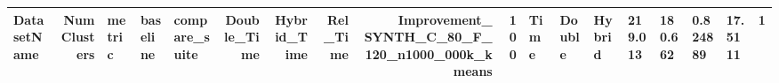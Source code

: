 \begin{tabular}{lrlllrrrrr}
\toprule
DatasetName & NumClusters & metric & baseline & compare_suite & Double_Time & Hybrid_Time & Rel_Time & Improvement_%
\midrule
SYNTH_C_80_F_120_n1000_000k_kmeans & 100 & Time & Double & Hybrid & 219.013 & 180.662 & 0.824889 & 17.5111 & 1 \\
\bottomrule
\end{tabular}
